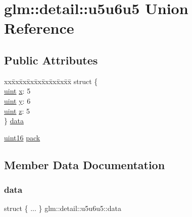 \hypertarget{unionglm_1_1detail_1_1u5u6u5}{}\section{glm\+:\+:detail\+:\+:u5u6u5 Union Reference}
\label{unionglm_1_1detail_1_1u5u6u5}
\subsection*{Public Attributes}
\begin{DoxyCompactItemize}
\item 
\begin{tabbing}
xx\=xx\=xx\=xx\=xx\=xx\=xx\=xx\=xx\=\kill
struct \{\\
\>\mbox{\hyperlink{group__core__precision_ga4fd29415871152bfb5abd588334147c8}{uint}} \mbox{\hyperlink{unionglm_1_1detail_1_1u5u6u5_ae265d637dd0e4430f3e96a509e19fb06}{x}}: 5\\
\>\mbox{\hyperlink{group__core__precision_ga4fd29415871152bfb5abd588334147c8}{uint}} \mbox{\hyperlink{unionglm_1_1detail_1_1u5u6u5_ab60581ca18c5faa107d8cbd5cfa946c9}{y}}: 6\\
\>\mbox{\hyperlink{group__core__precision_ga4fd29415871152bfb5abd588334147c8}{uint}} \mbox{\hyperlink{unionglm_1_1detail_1_1u5u6u5_ae0c24b8bea4457e78fe32f6e0cee6369}{z}}: 5\\
\} \mbox{\hyperlink{unionglm_1_1detail_1_1u5u6u5_ad4670f9777cab7784f9657693d365630}{data}}\\

\end{tabbing}\item 
\mbox{\hyperlink{namespaceglm_1_1detail_a47b2a7d006d187338e8031a352d1ce56}{uint16}} \mbox{\hyperlink{unionglm_1_1detail_1_1u5u6u5_a5ea89c1a491b7e1442cad93d92628b2e}{pack}}
\end{DoxyCompactItemize}


\subsection{Member Data Documentation}
\mbox{\label{unionglm_1_1detail_1_1u5u6u5_ad4670f9777cab7784f9657693d365630}} 
\subsubsection{\texorpdfstring{data}{data}}
{\footnotesize\ttfamily struct \{ ... \}   glm\+::detail\+::u5u6u5\+::data}

